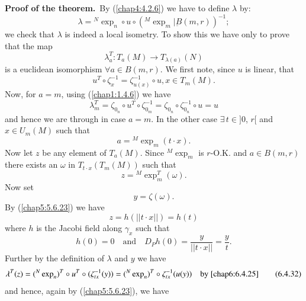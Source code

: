 \noindent
{\bf Proof of the theorem.}~By (\ref{chap4:4.2.6}) we have to define
$\lambda$ by:
\begin{equation*}
\lambda={}^{N}\exp_{n}\circ u\circ
({}^{M}\exp_{m}|\underbar{B}(m,r))^{-1};\tag{6.4.25}\label{chap6:6.4.25} 
\end{equation*}
we check that $\lambda$ is indeed a local isometry. To show this we
have only \pageoriginale to prove that the map
$$
\lambda^{T}_{a}:T_{a}(M)\to T_{\lambda(a)}(N)
$$
is a euclidean isomorphism $\forall a\in B(m,r)$. We first note, since
$u$ is linear, that
\begin{equation*}
u^{T}\circ \zeta^{-1}_{x}=\zeta^{-1}_{u(x)}\circ u, x\in
T_{m}(M).\tag{6.4.26}\label{chap6:6.4.26} 
\end{equation*}
Now, for $a=m$, using (\ref{chap1:1.4.6}) we have
$$
\lambda^{T}_{m}=\zeta_{0_{n}}\circ u^{T}\circ
\zeta^{-1}_{0_{m}}=\zeta_{0_{n}}\circ \zeta^{-1}_{0_{n}}\circ u=u
$$
and hence we are through in case $a=m$. In the other case $\exists\,
t\in ]0$, $r[$ and $x\in U_{m}(M)$ such that
\begin{equation*}
a={}^{M}\exp_{m}(t\cdot x).\tag{6.4.27}\label{chap6:6.4.27}
\end{equation*}
Now let $z$ be any element of $T_{a}(M)$. Since ${}^{M}\exp_{m}$ is
$r$-O.K. and $a\in B(m,r)$ there exists an $\omega$ in $T_{t\cdot
  x}(T_{m}(M))$ such that
\begin{equation*}
z={}^{M}\exp^{T}_{m}(\omega).\tag{6.4.28}\label{chap6:6.4.28}
\end{equation*}
Now set
\begin{equation*}
y=\zeta(\omega).\tag{6.4.29}\label{chap6:6.4.29}
\end{equation*}
By (\ref{chap5:5.6.23}) we have
\begin{equation*}
z=h(||t\cdot x||)=h(t)\tag{6.4.30}\label{chap6:6.4.30}
\end{equation*}
where $h$ is the Jacobi field along $\gamma_{x}$ such that
\begin{equation*}
h(0)=0\quad\text{and}\quad D_{P}h(0)=\frac{y}{||t\cdot
  x||}=\frac{y}{t}.\tag{6.4.31}\label{chap6:6.4.31} 
\end{equation*}
Further by the definition of $\lambda$ and $y$ we have
\begin{equation*}
\lambda^{T}(z)=({}^{N}\exp_{n})^{T}\circ
u^{T}\circ(\zeta^{-1}_{tx}(y))=({}^{N}\exp_{n})^{T}\circ
\zeta^{-1}_{tx}(u(y))\quad\text{by \eqref{chap6:6.4.25}}\tag{6.4.32}\label{chap6:6.4.32}
\end{equation*}
and \pageoriginale hence, again by (\ref{chap5:5.6.23}), we have
